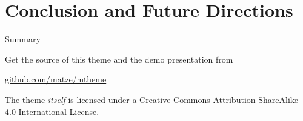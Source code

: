 \documentclass[10pt]{beamer}
\newcommand{\themename}{\textbf{\textsc{metropolis}}\xspace}
\begin{document}





\section{Conclusion and Future Directions}

\begin{frame}{Summary}

  Get the source of this theme and the demo presentation from

  \begin{center}\url{github.com/matze/mtheme}\end{center}

  The theme \emph{itself} is licensed under a
  \href{http://creativecommons.org/licenses/by-sa/4.0/}{Creative Commons
  Attribution-ShareAlike 4.0 International License}.

  \begin{center}\ccbysa\end{center}

\end{frame}
\end{document}
